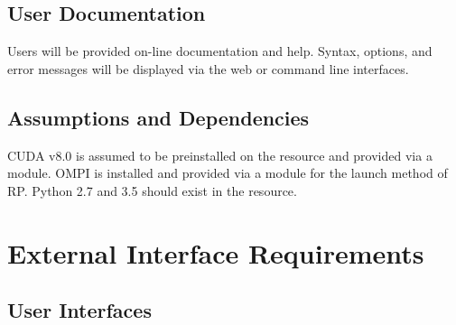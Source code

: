 \documentclass{scrreprt}
\begin{document}
\section{User Documentation}

Users will be provided on-line documentation and help.  Syntax, options, and error
messages will be displayed via the web or command line interfaces.

\section{Assumptions and Dependencies}

CUDA v8.0 is assumed to be preinstalled on the resource and provided via a module.
OMPI is installed and provided via a module for the launch method of RP. Python 2.7 
and 3.5 should exist in the resource.

\chapter{External Interface Requirements}

\section{User Interfaces}

\end{document}
